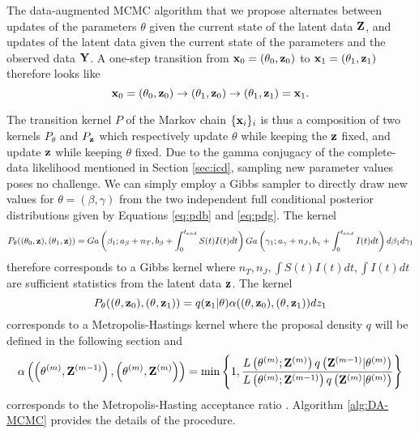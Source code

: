\documentclass[11pt]{article}
\begin{document}
	The data-augmented MCMC algorithm that we propose alternates between updates of the parameters $\theta$ given the current state of the latent data $\mathbf{Z}$, and updates of the latent data given the current state of the parameters and the observed data $\mathbf{Y}$. A one-step transition from $\mathbf{x}_0 = (\theta_0, \mathbf{z}_0)$ to $\mathbf{x}_1 = (\theta_1, \mathbf{z}_1)$ therefore looks like
	$$\mathbf{x}_0 = (\theta_0, \mathbf{z}_0) \rightarrow (\theta_1, \mathbf{z}_0) \rightarrow (\theta_1, \mathbf{z}_1) = \mathbf{x}_1.$$
	
	The transition kernel $P$ of the Markov chain $\{\mathbf{x}_i\}_i$ is thus a composition of two kernels $P_{\theta}$ and $P_{\mathbf{z}}$ which respectively update $\theta$ while keeping the $\mathbf{z}$ fixed, and update $\mathbf{z}$ while keeping $\theta$ fixed. Due to the gamma conjugacy of the complete-data likelihood mentioned in Section \ref{sec:icd}, sampling new parameter values poses no challenge. We can simply employ a Gibbs sampler to directly draw new values for $\theta = (\beta, \gamma)$ from the two independent full conditional posterior distributions given by Equations \ref{eq:pdb} and \ref{eq:pdg}. The kernel 
	$$
	P_{\theta}((\theta_0, \mathbf{z}), (\theta_1, \mathbf{z})) = Ga\left( \beta_1; a_{\beta} + n_T, b_{\beta} + \int_0^{t_{end}} S(t)I(t) dt\right) Ga\left( \gamma_1; a_{\gamma} + n_J, b_{\gamma} + \int_0^{t_{end}} I(t) dt\right) d\beta_1 d\gamma_1
	$$
	therefore corresponds to a Gibbs kernel where $n_T, n_J, \int S(t)I(t) dt, \int I(t) dt$ are sufficient statistics from the latent data $\mathbf{z}$. The kernel
	$$
	P_{\theta}((\theta, \mathbf{z}_0), (\theta, \mathbf{z}_1)) = q(\mathbf{z}_1|\theta) \alpha((\theta, \mathbf{z}_0), (\theta, \mathbf{z}_1)) dz_1
	$$
	corresponds to a Metropolis-Hastings kernel where the proposal density $q$ will be defined in the following section and
	$$
	\alpha\left( \left( \theta^{(m)}, \mathbf{Z}^{(m-1)}\right) , \left( \theta^{(m)}, \mathbf{Z}^{(m)}\right) \right) = \min\left\lbrace 1, \dfrac{L\left( \theta^{(m)}; \mathbf{Z}^{(m)}\right) q\left( \mathbf{Z}^{(m - 1)}|\theta^{(m)}\right) }{L\left( \theta^{(m)};\mathbf{Z}^{(m - 1)}\right) q\left( \mathbf{Z}^{(m)}|\theta^{(m)}\right) }\right\rbrace
	$$
	corresponds to the Metropolis-Hasting acceptance ratio \cite{Tierney.1994}.	
	Algorithm \ref{alg:DA-MCMC} provides the details of the procedure.
	
\end{document}

